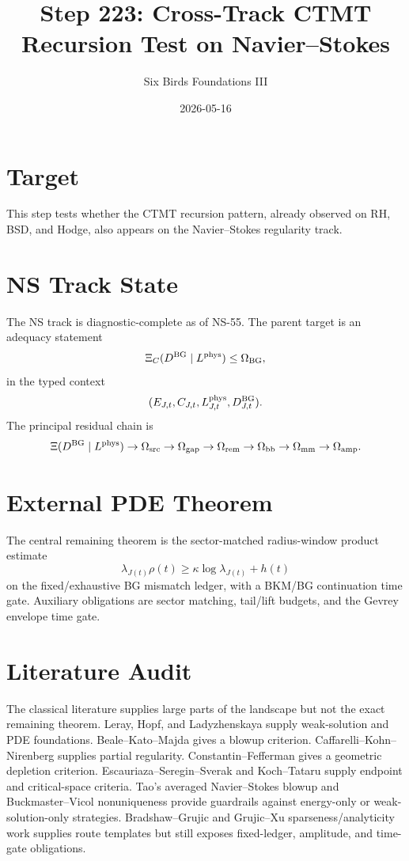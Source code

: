 \documentclass{article}
\title{Step 223: Cross-Track CTMT Recursion Test on Navier--Stokes}
\author{Six Birds Foundations III}
\date{2026-05-16}
\begin{document}
\maketitle

\section{Target}

This step tests whether the CTMT recursion pattern, already observed on RH, BSD, and Hodge, also appears on the Navier--Stokes regularity track.

\section{NS Track State}

The NS track is diagnostic-complete as of NS-55. The parent target is an adequacy statement
\[
\Xi_C(D^{\rm BG}\mid L^{\rm phys})\leq \Omega_{\rm BG},
\]
in the typed context
\[
(E_{J,t},C_{J,t},L^{\rm phys}_{J,t},D^{\rm BG}_{J,t}).
\]
The principal residual chain is
\[
\Xi(D^{\rm BG}\mid L^{\rm phys})
\to
\Omega_{\rm src}
\to
\Omega_{\rm gap}
\to
\Omega_{\rm rem}
\to
\Omega_{\rm bb}
\to
\Omega_{\rm mm}
\to
\Omega_{\rm amp}.
\]

\section{External PDE Theorem}

The central remaining theorem is the sector-matched radius-window product estimate
\[
\lambda_{J(t)}\rho(t)\geq \kappa\log\lambda_{J(t)}+h(t)
\]
on the fixed/exhaustive BG mismatch ledger, with a BKM/BG continuation time gate. Auxiliary obligations are sector matching, tail/lift budgets, and the Gevrey envelope time gate.

\section{Literature Audit}

The classical literature supplies large parts of the landscape but not the exact remaining theorem. Leray, Hopf, and Ladyzhenskaya supply weak-solution and PDE foundations. Beale--Kato--Majda gives a blowup criterion. Caffarelli--Kohn--Nirenberg supplies partial regularity. Constantin--Fefferman gives a geometric depletion criterion. Escauriaza--Seregin--Sverak and Koch--Tataru supply endpoint and critical-space criteria. Tao's averaged Navier--Stokes blowup and Buckmaster--Vicol nonuniqueness provide guardrails against energy-only or weak-solution-only strategies. Bradshaw--Grujic and Grujic--Xu sparseness/analyticity work supplies route templates but still exposes fixed-ledger, amplitude, and time-gate obligations.
\end{document}
